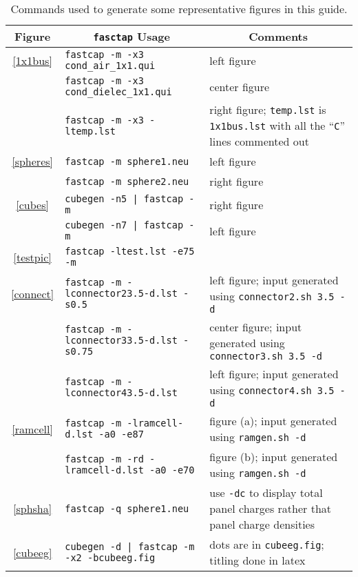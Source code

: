 \begin{table}
\begin{center}
\begin{tabular}{clp{2.0in}}\hline
\multicolumn{1}{c}{Figure} & \multicolumn{1}{c}{{\tt fasctap} Usage} &
\multicolumn{1}{c}{Comments} \\ \hline
\protect\ref{1x1bus} & {\tt fastcap -m -x3 cond\_air\_1x1.qui}& left figure \\
& {\tt fastcap -m -x3 cond\_dielec\_1x1.qui} & center figure \\
& {\tt fastcap -m -x3 -ltemp.lst} & right figure; {\tt temp.lst} is 
{\tt 1x1bus.lst} with all the ``{\tt C}'' lines commented out\\
\hline
\protect\ref{spheres} & {\tt fastcap -m sphere1.neu} & left figure \\
& {\tt fastcap -m sphere2.neu} & right figure \\
\hline
\protect\ref{cubes} & {\tt cubegen -n5 | fastcap -m} & right figure \\
& {\tt cubegen -n7 | fastcap -m} & left figure \\
\hline
\protect\ref{testpic} & {\tt fastcap -ltest.lst -e75 -m} & \\
\hline
\protect\ref{connect} & {\tt fastcap -m -lconnector23.5-d.lst -s0.5} & left figure; input generated using  {\tt connector2.sh 3.5 -d}\\
& {\tt fastcap -m -lconnector33.5-d.lst -s0.75} & center figure; input generated using  {\tt connector3.sh 3.5 -d}\\
& {\tt fastcap -m -lconnector43.5-d.lst} & left figure; input
generated using {\tt connector4.sh 3.5 -d}\\
\hline
\protect\ref{ramcell} & {\tt fastcap -m -lramcell-d.lst -a0 -e87}
& figure (a); input generated using {\tt ramgen.sh -d}\\
& {\tt fastcap -m -rd -lramcell-d.lst -a0 -e70}
& figure (b); input generated using {\tt ramgen.sh -d}\\
\hline
\protect\ref{sphsha} & {\tt fastcap -q sphere1.neu} & use {\tt -dc} to display
total panel charges rather that panel charge densities \\
\hline
\protect\ref{cubeeg} & {\tt cubegen -d | fastcap -m -x2 -bcubeeg.fig} &
dots are in {\tt cubeeg.fig}; titling done in latex\\
\hline
\end{tabular}
\caption{Commands used to generate some representative figures in this guide.}
\label{dashmuse}
\end{center}
\end{table}

